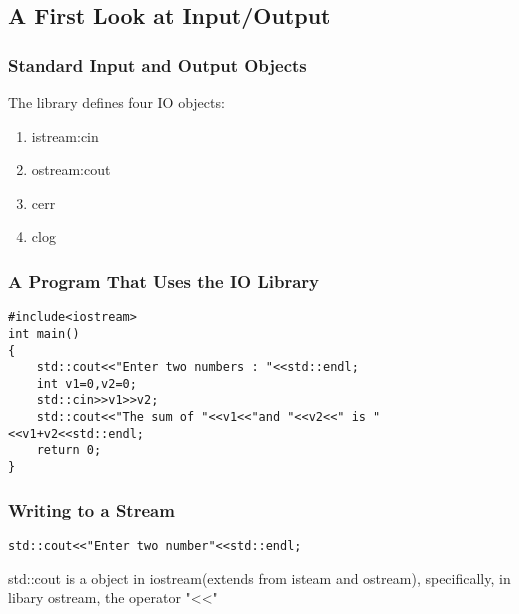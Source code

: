 \documentclass[11pt]{article}
\begin{document}
\subsection{A First Look at Input/Output}
\label{sec-1-2}
\subsubsection{Standard Input and Output Objects}
\label{sec-1-2-1}
The library defines four IO objects:
\begin{enumerate}
\item istream:cin
\item ostream:cout
\item cerr
\item clog
\end{enumerate}
\subsubsection{A Program That Uses the IO Library}
\label{sec-1-2-2}
\begin{verbatim}
#include<iostream>
int main()
{
    std::cout<<"Enter two numbers : "<<std::endl;
    int v1=0,v2=0;
    std::cin>>v1>>v2;
    std::cout<<"The sum of "<<v1<<"and "<<v2<<" is "<<v1+v2<<std::endl;
    return 0;
}
\end{verbatim}
\subsubsection{Writing to a Stream}
\label{sec-1-2-3}
\begin{verbatim}
std::cout<<"Enter two number"<<std::endl;
\end{verbatim}
std::cout is a object in iostream(extends from isteam and ostream), specifically, in 
libary ostream, the operator "<<" 
\end{document}
